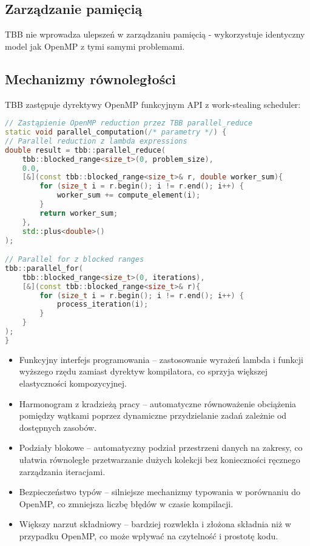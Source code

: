 \subsection{Zarządzanie pamięcią}
TBB nie wprowadza ulepszeń w zarządzaniu pamięcią - wykorzystuje identyczny model jak OpenMP z tymi samymi problemami.

\subsection{Mechanizmy równoległości}
TBB zastępuje dyrektywy OpenMP funkcyjnym API z work-stealing scheduler:
\begin{lstlisting}[language=C++, caption={Implementacja TBB - równoległość}, label={lst:tbb-parallelism}]
// Zastąpienie OpenMP reduction przez TBB parallel_reduce
static void parallel_computation(/* parametry */) {
// Parallel reduction z lambda expressions
double result = tbb::parallel_reduce(
    tbb::blocked_range<size_t>(0, problem_size), 
    0.0, 
    [&](const tbb::blocked_range<size_t>& r, double worker_sum){
        for (size_t i = r.begin(); i != r.end(); i++) {
            worker_sum += compute_element(i);
        }
        return worker_sum;
    }, 
    std::plus<double>()
);

// Parallel for z blocked ranges
tbb::parallel_for(
    tbb::blocked_range<size_t>(0, iterations), 
    [&](const tbb::blocked_range<size_t>& r){
        for (size_t i = r.begin(); i != r.end(); i++) {
            process_iteration(i);
        }
    }
);
}
\end{lstlisting}
\begin{itemize}
    \item Funkcyjny interfejs programowania – zastosowanie wyrażeń lambda i funkcji wyższego rzędu zamiast dyrektyw kompilatora, co sprzyja większej elastyczności kompozycyjnej.
    
    \item Harmonogram z kradzieżą pracy  – automatyczne równoważenie obciążenia pomiędzy wątkami poprzez dynamiczne przydzielanie zadań zależnie od dostępnych zasobów.
    
    \item Podziały blokowe – automatyczny podział przestrzeni danych na zakresy, co ułatwia równoległe przetwarzanie dużych kolekcji bez konieczności ręcznego zarządzania iteracjami.
    
    \item Bezpieczeństwo typów – silniejsze mechanizmy typowania w porównaniu do OpenMP, co zmniejsza liczbę błędów w czasie kompilacji.
    
    \item Większy narzut składniowy – bardziej rozwlekła i złożona składnia niż w przypadku OpenMP, co może wpływać na czytelność i prostotę kodu.
\end{itemize}

